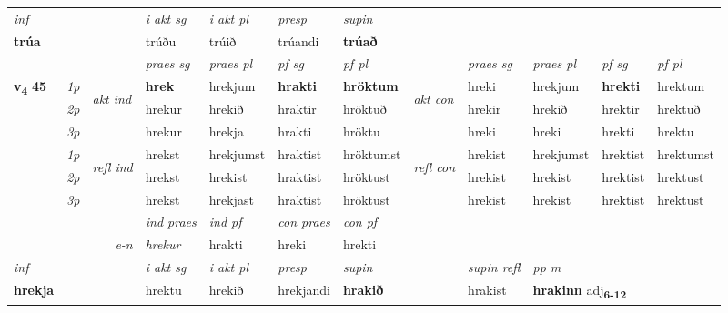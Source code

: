 \begin{longtable}[l]{X>{\footnotesize\itshape}llXXXXlXXXX}
   {\textit{inf}} & &  & \textit{i akt sg} & \textit{i akt pl}   & \textit{presp} & \textit{supin}   \\*
  {\textbf{trúa}} & && trúðu  & trúið   & trúandi &  \textbf{trúað}   \\*

\midrule

 & &   & \textit{praes sg}  & \textit{praes pl}    & \textit{ pf sg} & \textit{pf pl} & & \textit{praes sg}  & \textit{praes pl}    & \textit{pf sg} & \textit{pf pl }  \\ \cmidrule{4-7} \cmidrule{9-12}
 \multirow{2}{*}{{{\textbf{v{\textsubscript{4}}} \Large{\textbf{45}}}}}  & 1p & \multirow{3}{*}{\begin{turn}{90}\textit{akt ind}\end{turn}} & \textbf{hrek} & hrekjum & \textbf{hrakti} & \textbf{hröktum} & \multirow{3}{*}{\begin{turn}{90}\textit{akt con}\end{turn}} &hreki & hrekjum & \textbf{hrekti} & hrektum\\*
 & 2p &  &  hrekur  & hrekið & hraktir & hröktuð & & hrekir & hrekið & hrektir & hrektuð \\*
 & 3p &  & hrekur & hrekja & hrakti & hröktu & & hreki & hreki& hrekti & hrektu \\*
\cmidrule{4-7} \cmidrule{9-12}
 & 1p & \multirow{3}{*}{\begin{turn}{90}\textit{refl ind}\end{turn}}  & hrekst & hrekjumst & hraktist & hröktumst & \multirow{3}{*}{\begin{turn}{90}\textit{refl con}\end{turn}}  &hrekist & hrekjumst & hrektist & hrektumst \\*
 & 2p &  & hrekst & hrekist & hraktist & hröktust & &hrekist & hrekist & hrektist & hrektust \\*
 & 3p  & & hrekst & hrekjast & hraktist & hröktust & & hrekist & hrekist& hrektist & hrektust \\*
\cmidrule{4-7} \cmidrule{9-12}

   && &  \textit{ind praes} & \textit{ind pf} & \textit{con praes} & \textit{con pf} \\*
\multicolumn{3}{r}{\textit{e-n}} & hrekur & hrakti & hreki & hrekti \\*

\cmidrule{4-7}
   {\textit{inf}} & &  & \textit{i akt sg} & \textit{i akt pl}   & \textit{presp} & \textit{supin} && \textit{supin refl} & \textit{pp m} \\*
  {\textbf{hrekja}} & && hrektu  & hrekið   & hrekjandi &  \textbf{hrakið} && hrakist & \multicolumn{2}{l}{\textbf{hrakinn} adj\textbf{\textsubscript{6-12}}} \\*


\end{longtable}
